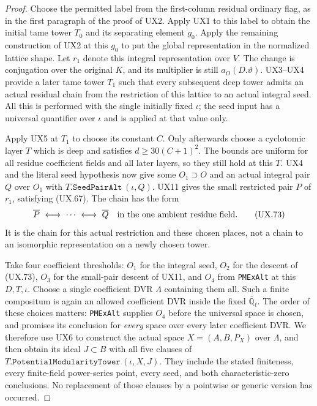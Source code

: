 \begin{proof}
Choose the permitted label from the first-column
residual ordinary flag, as in the first paragraph
of the proof of UX2.  Apply UX1 to this label to
obtain the initial tame tower $T_0$ and its
separating element $g_0$.  Apply the remaining
construction of UX2 at this $g_0$ to put the
global representation in the normalized lattice
shape.  Let $r_1$ denote this integral representation
over $V$.  The change is conjugation over the
original $K$, and its multiplier is still
$a_O(D.\vartheta)$.  UX3--UX4 provide a later tame tower
$T_1$ such that every subsequent deep tower admits
an actual residual chain from the restriction of
this lattice to an actual integral seed.
All this is performed with the single initially
fixed $\iota$; the seed input has a universal
quantifier over $\iota$ and is applied at that
value only.

Apply UX5 at $T_1$ to choose its constant $C$.
Only afterwards choose a cyclotomic layer $T$
which is deep and satisfies
$d\ge30(C+1)^2$.  The bounds are uniform for
all residue coefficient fields and all later
layers, so they still hold at this $T$.
UX4 and the literal seed hypothesis now give
some $O_1\supset O$ and an actual integral
pair $Q$ over $O_1$ with
$T.\mathtt{SeedPairAlt}\,(\iota,Q)$.
UX11 gives the small restricted pair $P$ of
$r_1$, satisfying (UX.67).  The chain has the
form
\[
 \overline P\ \longleftrightarrow\ \cdots\
 \longleftrightarrow\ \overline Q
 \quad\hbox{in the one ambient residue field.}
 \tag{UX.73}
\]
It is the chain for this actual restriction and
these chosen places, not a chain to an isomorphic
representation on a newly chosen tower.

Take four coefficient thresholds: $O_1$ for the
integral seed, $O_2$ for the descent of (UX.73),
$O_3$ for the small-pair descent of UX11, and
$O_4$ from \texttt{PMExAlt} at this $D,T,\iota$.
Choose a single coefficient DVR $\Lambda$
containing them all.  Such a finite compositum
is again an allowed coefficient DVR inside the
fixed $\overline{\mathbb Q}_\ell$.
The order of these choices matters:
\texttt{PMExAlt} supplies $O_4$ before the
universal space is chosen, and promises its
conclusion for \emph{every} space over every
later coefficient DVR.  We therefore use UX6
to construct the actual space $X=(A,B,P_X)$
over $\Lambda$, and then obtain its ideal
$J\subset B$ with all five clauses of
$T.\mathtt{PotentialModularityTower}\,(\iota,X,J)$.
They include the stated finiteness, every
finite-field power-series point, every seed,
and both characteristic-zero conclusions.
No replacement of those clauses by a pointwise
or generic version has occurred.


\end{proof}
